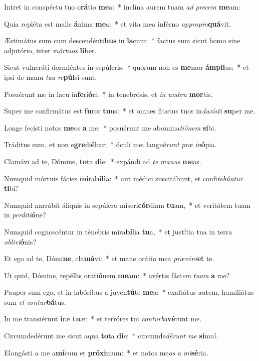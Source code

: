 \item Intret in conspéctu tuo o\textbf{rá}tio \textbf{me}a:~* inclína aurem tuam \textit{ad} \textit{pre}\textit{cem} \textbf{me}am:
\item Quia repléta est malis \textbf{á}nima \textbf{me}a:~* et vita mea inférno \textit{ap}\textit{pro}\textit{pin}\textbf{quá}vit.
\item Æstimátus sum cum descendénti\textbf{bus} in \textbf{la}cum:~* factus sum sicut homo sine adjutório, inter \textit{mór}\textit{tu}\textit{os} \textbf{li}ber.
\item Sicut vulneráti dormiéntes in sepúlcris,~† quorum non es \textbf{me}mor \textbf{ám}\textbf{pli}us:~* et ipsi de manu \textit{tu}\textit{a} \textit{re}\textbf{púl}si sunt.
\item Posuérunt me in lacu in\textbf{fe}ri\textbf{ó}ri:~* in tenebrósis, et \textit{in} \textit{um}\textit{bra} \textbf{mor}tis.
\item Super me confirmátus est \textbf{fu}ror \textbf{tu}us:~* et omnes fluctus tuos in\textit{du}\textit{xís}\textit{ti} \textbf{su}per me.
\item Longe fecísti notos \textbf{me}os \textbf{a} me:~* posuérunt me abomina\textit{ti}\textit{ó}\textit{nem} \textbf{si}bi.
\item Tráditus sum, et non e\textbf{gre}di\textbf{é}bar:~* óculi mei langué\textit{runt} \textit{præ} \textit{in}\textbf{ó}pia.
\item Clamávi ad te, Dómine, \textbf{to}ta \textbf{di}e:~* expándi ad \textit{te} \textit{ma}\textit{nus} \textbf{me}as.
\item Numquid mórtuis fácies \textbf{mi}ra\textbf{bí}\textbf{li}a:~* aut médici suscitábunt, et confi\textit{te}\textit{bún}\textit{tur} \textbf{ti}bi?
\item Numquid narrábit áliquis in sepúlcro miseri\textbf{cór}diam \textbf{tu}am,~* et veritátem tuam in \textit{per}\textit{di}\textit{ti}\textbf{ó}ne?
\item Numquid cognoscéntur in ténebris mira\textbf{bí}lia \textbf{tu}a,~* et justítia tua in terra \textit{ob}\textit{li}\textit{vi}\textbf{ó}nis?
\item Et ego ad te, Dómi\textbf{ne}, cla\textbf{má}vi:~* et mane orátio mea \textit{præ}\textit{vé}\textit{ni}\textbf{et} te.
\item Ut quid, Dómine, repéllis orati\textbf{ó}nem \textbf{me}am:~* avértis fáci\textit{em} \textit{tu}\textit{am} \textbf{a} me?
\item Pauper sum ego, et in labóribus a juven\textbf{tú}te \textbf{me}a:~* exaltátus autem, humiliátus sum \textit{et} \textit{con}\textit{tur}\textbf{bá}tus.
\item In me transiérunt \textbf{i}ræ \textbf{tu}æ:~* et terróres tui \textit{con}\textit{tur}\textit{ba}\textbf{vé}runt me.
\item Circumdedérunt me sicut aqua \textbf{to}ta \textbf{di}e:~* circumde\textit{dé}\textit{runt} \textit{me} \textbf{si}mul.
\item Elongásti a me a\textbf{mí}cum et \textbf{pró}\textbf{xi}mum:~* et notos me\textit{os} \textit{a} \textit{mi}\textbf{sé}ria.
